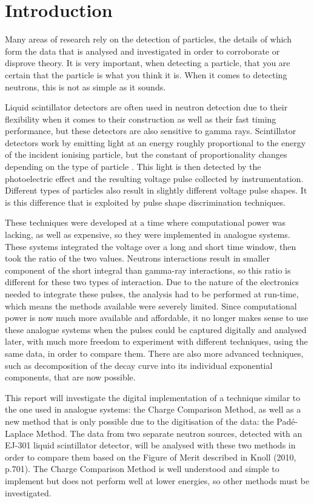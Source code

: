 \documentclass[11pt]{article}
\numberwithin{equation}{section}
\numberwithin{figure}{section}
\numberwithin{table}{section}
\begin{document}
\section{Introduction}\label{sec:Introduction}
\par Many areas of research rely on the detection of particles, the details of which form the data that is analysed and investigated in order to corroborate or disprove theory. It is very important, when detecting a particle, that you are certain that the particle is what you think it is. When it comes to detecting neutrons, this is not as simple as it sounds. 
\par Liquid scintillator detectors are often used in neutron detection due to their flexibility when it comes to their construction as well as their fast timing performance, but these detectors are also sensitive to gamma rays. Scintillator detectors work by emitting light at an energy roughly proportional to the energy of the incident ionising particle, but the constant of proportionality changes depending on the type of particle \cite{Knoll}. This light is then detected by the photoelectric effect and the resulting voltage pulse collected by instrumentation. Different types of particles also result in slightly different voltage pulse shapes. It is this difference that is exploited by pulse shape discrimination techniques. 
\par These techniques were developed at a time where computational power was lacking, as well as expensive, so they were implemented in analogue systems. These systems integrated the voltage over a long and short time window, then took the ratio of the two values. Neutrons interactions result in smaller component of the short integral than gamma-ray interactions, so this ratio is different for these two types of interaction. Due to the nature of the electronics needed to integrate these pulses, the analysis had to be performed at run-time, which means the methods available were severely limited. Since computational power is now much more available and affordable, it no longer makes sense to use these analogue systems when the pulses could be captured digitally and analysed later, with much more freedom to experiment with different techniques, using the same data, in order to compare them. There are also more advanced techniques, such as decomposition of the decay curve into its individual exponential components, that are now possible.
\par This report will investigate the digital implementation of a technique similar to the one used in analogue systems: the Charge Comparison Method, as well as a new method that is only possible due to the digitisation of the data: the Pad\'e-Laplace Method. The data from two separate neutron sources, detected with an EJ-301 liquid scintillator detector, will be analysed with these two methods in order to compare them based on the Figure of Merit described in Knoll (2010, p.701). The Charge Comparison Method is well understood and simple to implement but does not perform well at lower energies, so other methods must be investigated.
\end{document}
